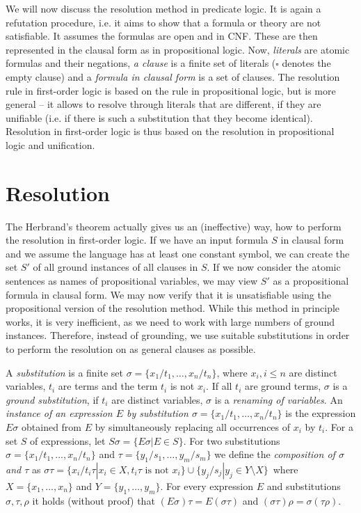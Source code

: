 We will now discuss the resolution method in predicate logic. It is again a refutation procedure, i.e. it aims to show that a formula or theory are not satisfiable. It assumes the formulas are open and in CNF. These are then represented in the clausal form as in propositional logic. Now, \emph{literals} are atomic formulas and their negations, \emph{a clause} is a finite set of literals ($\square$ denotes the empty clause) and a \emph{formula in clausal form} is a set of clauses. The resolution rule in first-order logic is based on the rule in propositional logic, but is more general -- it allows to resolve through literals that are different, if they are unifiable (i.e. if there is such a substitution that they become identical). Resolution in first-order logic is thus based on the resolution in propositional logic and unification.

\section{Resolution}

The Herbrand's theorem actually gives us an (ineffective) way, how to perform the resolution in first-order logic. If we have an input formula $S$ in clausal form and we assume the language has at least one constant symbol, we can create the set $S'$ of all ground instances of all clauses in $S$. If we now consider the atomic sentences as names of propositional variables, we may view $S'$ as a propositional formula in clausal form. We may now verify that it is unsatisfiable using the propositional version of the resolution method. While this method in principle works, it is very inefficient, as we need to work with large numbers of ground instances. Therefore, instead of grounding, we use suitable substitutions in order to perform the resolution on as general clauses as possible.

A \emph{substitution} is a finite set $\sigma = \{x_1/t_1, \dots, x_n/t_n\}$, where $x_i, i \leq n$ are distinct variables, $t_i$ are terms and the term $t_i$ is not $x_i$. If all $t_i$ are ground terms, $\sigma$ is a \emph{ground substitution}, if $t_i$ are distinct variables, $\sigma$ is a \emph{renaming of variables}. An \emph{instance of an expression $E$ by substitution $\sigma = \{x_1/t_1, \dots, x_n/t_n\}$} is the expression $E \sigma$ obtained from $E$ by simultaneously replacing all occurrences of $x_i$ by $t_i$. For a set $S$ of expressions, let $S \sigma = \{E \sigma| E \in S\}$. For two substitutions $\sigma = \{x_1/t_1, \dots, x_n/t_n\}$ and $\tau = \{y_1/s_1, \dots, y_m/s_m\}$ we define the \emph{composition of $\sigma$ and $\tau$} as $\sigma \tau = \{x_i/t_i \tau| x_i \in X, t_i \tau\text{ is not }x_i\} \cup \{y_j/s_j|y_j \in Y \setminus X\}\,$ where $X = \{x_1, \dots, x_n\}$ and $Y = \{y_1, \dots, y_m\}$. For every expression $E$ and substitutions $\sigma, \tau, \rho$ it holds (without proof) that $(E \sigma)\tau = E(\sigma \tau)$ and $(\sigma \tau)\rho = \sigma(\tau \rho)$.

